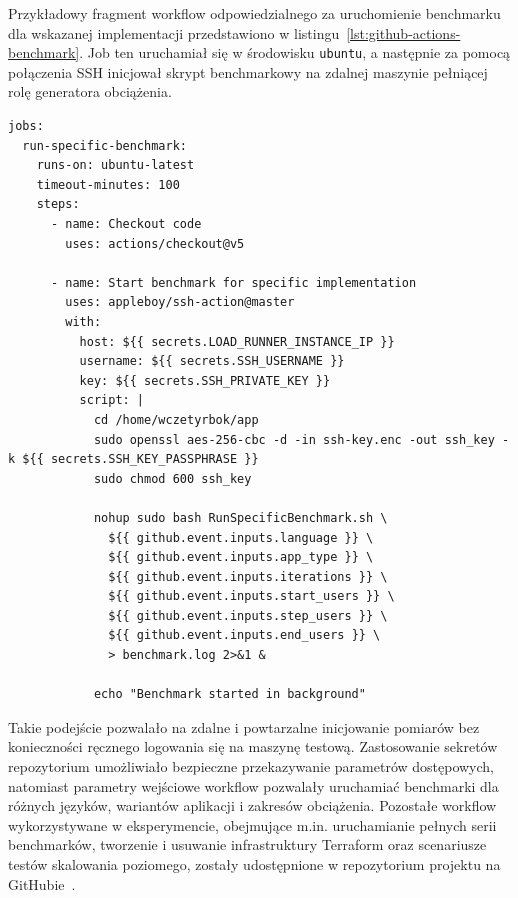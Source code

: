 Przykładowy fragment workflow odpowiedzialnego za uruchomienie benchmarku dla wskazanej implementacji przedstawiono w listingu~\ref{lst:github-actions-benchmark}. Job ten uruchamiał się w środowisku \texttt{ubuntu}, a następnie za pomocą połączenia SSH inicjował skrypt benchmarkowy na zdalnej maszynie pełniącej rolę generatora obciążenia.

\begin{listing}[H]
    \begin{verbatim}
jobs:
  run-specific-benchmark:
    runs-on: ubuntu-latest
    timeout-minutes: 100
    steps:
      - name: Checkout code
        uses: actions/checkout@v5

      - name: Start benchmark for specific implementation
        uses: appleboy/ssh-action@master
        with:
          host: ${{ secrets.LOAD_RUNNER_INSTANCE_IP }}
          username: ${{ secrets.SSH_USERNAME }}
          key: ${{ secrets.SSH_PRIVATE_KEY }}
          script: |
            cd /home/wczetyrbok/app
            sudo openssl aes-256-cbc -d -in ssh-key.enc -out ssh_key -k ${{ secrets.SSH_KEY_PASSPHRASE }}
            sudo chmod 600 ssh_key

            nohup sudo bash RunSpecificBenchmark.sh \
              ${{ github.event.inputs.language }} \
              ${{ github.event.inputs.app_type }} \
              ${{ github.event.inputs.iterations }} \
              ${{ github.event.inputs.start_users }} \
              ${{ github.event.inputs.step_users }} \
              ${{ github.event.inputs.end_users }} \
              > benchmark.log 2>&1 &

            echo "Benchmark started in background"
    \end{verbatim}
    \caption{Przykładowy workflow GitHub Actions uruchamiający benchmark dla wybranej implementacji}
    \label{lst:github-actions-benchmark}
\end{listing}

Takie podejście pozwalało na zdalne i powtarzalne inicjowanie pomiarów bez konieczności ręcznego logowania się na maszynę testową. Zastosowanie sekretów repozytorium umożliwiało bezpieczne przekazywanie parametrów dostępowych, natomiast parametry wejściowe workflow pozwalały uruchamiać benchmarki dla różnych języków, wariantów aplikacji i zakresów obciążenia. Pozostałe workflow wykorzystywane w eksperymencie, obejmujące m.in. uruchamianie pełnych serii benchmarków, tworzenie i usuwanie infrastruktury Terraform oraz scenariusze testów skalowania poziomego, zostały udostępnione w repozytorium projektu na GitHubie~\cite{repo_github_workflows}.
